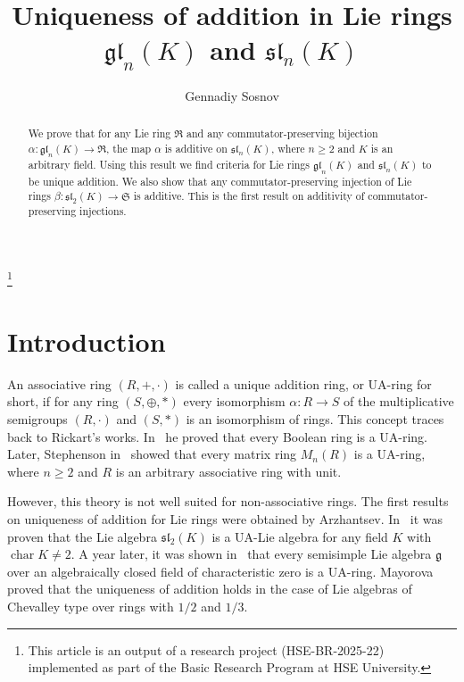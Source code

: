 \documentclass[a4paper,reqno,12pt]{amsart}
\theoremstyle{definition}
\theoremstyle{remark}
\DeclareMathOperator{\Char}{char}
\def\RRR{\mathfrak{R}}
\def\SSS{\mathfrak{S}}
\def\ggg{\mathfrak{g}}
\def\gl{\mathfrak{gl}}
\def\sl{\mathfrak{sl}}
\renewcommand{\ge}{\geqslant}
\begin{document}
    \date{}
    \title[Uniqueness of addition in Lie rings $\gl_n(K)$ and $\sl_n(K)$]{Uniqueness of addition in Lie rings $\gl_n(K)$ and $\sl_n(K)$}
    \author{Gennadiy Sosnov}
    \address{Faculty of Computer Science, HSE University, Pokrovsky Boulevard 11, Moscow, 109028 Russia}
	\thanks{This article is an output of a research project (HSE-BR-2025-22) implemented as part of the Basic Research Program at HSE University.}
    
    \begin{abstract}
    We prove that for any Lie ring $\RRR$ and any commutator-preserving bijection $\alpha : \gl_n(K) \rightarrow \RRR$, the map $\alpha$ is additive on $\sl_n(K)$, where $n \ge 2$ and $K$ is an arbitrary field. Using this result we find criteria for Lie rings $\gl_n(K)$ and $\sl_n(K)$ to be unique addition. We also show that any commutator-preserving injection of Lie rings $\beta : \sl_2(K) \rightarrow \SSS$ is additive. This is the first result on additivity of commutator-preserving injections.
    \end{abstract}
    \maketitle


    \section{Introduction}
    \label{sec1}

    An associative ring $(R, +, \cdot)$ is called a unique addition ring, or UA-ring for short, if for any ring $(S, \oplus, *)$ every isomorphism $\alpha : R \rightarrow S$ of the multiplicative semigroups $(R, \cdot)$ and $(S, *)$ is an isomorphism of rings. This concept traces back to Rickart's works. In~\cite{Rickart1948} he proved that every Boolean ring is a UA-ring. Later, Stephenson in~\cite{Stephenson1969} showed that every matrix ring $M_n(R)$ is a UA-ring, where $n \ge 2$ and $R$ is an arbitrary associative ring with unit.

    However, this theory is not well suited for non-associative rings. The first results on uniqueness of addition for Lie rings were obtained by Arzhantsev. In~\cite{Arzhantsev2000} it was proven that the Lie algebra $\sl_2(K)$ is a UA-Lie algebra for any field $K$ with $\Char K \neq 2$. A year later, it was shown in~\cite{Arzhantsev2001} that every semisimple Lie algebra $\ggg$ over an algebraically closed field of characteristic zero is a UA-ring. Mayorova~\cite{Mayorova2019} proved that the uniqueness of addition holds in the case of Lie algebras of Chevalley type over rings with $1/2$ and $1/3$.
	
\end{document}
